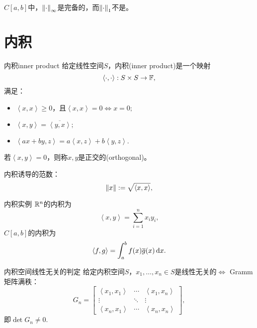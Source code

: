 $C[a,b]$中，$\left\lVert\cdot\right\rVert_\infty$是完备的，而$\left\lVert\cdot\right\rVert_1$不是。

\section{内积}
\label{sec:inner product}

\newcommand{\inp}[2]{\left\langle #1,#2\right\rangle}  %


\begin{definition}
    {内积}{inner product}
    给定线性空间$S$，内积(inner product)是一个映射
    \begin{equation}
        \inp\cdot\cdot:S\times S\to\FF,
    \end{equation}
    满足：
    \begin{itemize}
        \item $\inp xx\geq 0$，且$\inp xx=0\iff x=0;$
        \item $\inp xy=\overline{\inp yx};$
        \item $\inp{ax+by}z=a\inp xz+b\inp yz.$
    \end{itemize}
    若$\inp xy=0$，则称$x,y$是正交的(orthogonal)。
\end{definition}

内积诱导的范数：
\begin{equation}
    \norm x:=\sqrt{\inp xx},
\end{equation}

\begin{example}
    {内积实例}{}
    $\mathbb R^n$的内积为
    \[
        \inp xy=\sum_{i=1}^nx_iy_i,
    \]
    $C[a,b]$的内积为 
    \[
        \inp fg=\int_a^bf(x)\overline g(x)\d x.
    \]
\end{example}

\begin{theorem}
    {内积空间线性无关的判定}{}
    给定内积空间$S$，$x_1,\ldots,x_n\in S$是线性无关的$\iff$ Gramm矩阵满秩：
    \begin{equation}
        G_n=\begin{bmatrix}
            \inp{x_1}{x_1}&\cdots&\inp{x_1}{x_n}\\
            \vdots&\ddots&\vdots\\
            \inp{x_n}{x_1}&\cdots&\inp{x_n}{x_n}
        \end{bmatrix},
    \end{equation}
    即$\det G_n\neq 0.$
\end{theorem}

